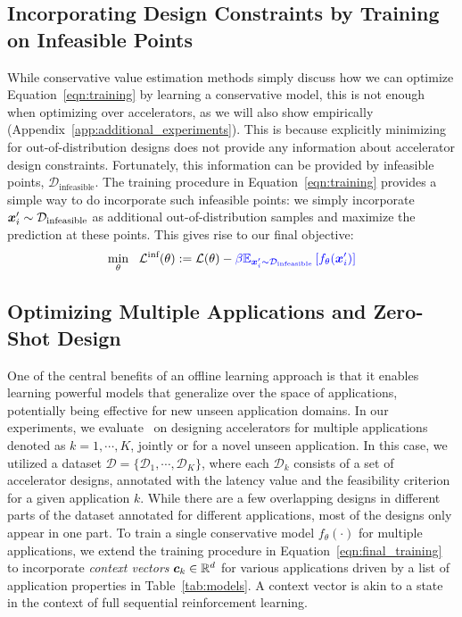 \subsection{Incorporating Design Constraints by Training on Infeasible Points}
While conservative value estimation methods simply discuss how we can optimize Equation~\ref{eqn:training} by learning a conservative model, this is not enough when optimizing over accelerators, as we will also show empirically (Appendix~\ref{app:additional_experiments}).
This is because explicitly minimizing for out-of-distribution designs does not provide any information about accelerator design constraints. Fortunately, this information can be provided by infeasible points, $\mathcal{D}_\text{infeasible}$. The training procedure in Equation~\ref{eqn:training} provides a simple way to do incorporate such infeasible points: we simply incorporate ${\boldsymbol{x}}'_i \sim \mathcal{D}_{\text{infeasible}}$ as additional out-of-distribution samples and maximize the prediction at these points.
This gives rise to our final objective:
\begin{equation}
\label{eqn:final_training}
    \min_\theta~~ \mathcal{L}^\text{inf}(\theta) := \mathcal{L}(\theta)
    - \textcolor{blue}{\beta \mathbb{E}_{{\boldsymbol{x}}'_i \sim \mathcal{D}_{\text{infeasible}}}\left[ f_\theta({\boldsymbol{x}}'_i) \right]}
\end{equation}

\subsection{Optimizing Multiple Applications and Zero-Shot Design}
%
One of the central benefits of an offline learning approach is that it enables learning powerful models that generalize over the space of applications, potentially being effective for new unseen application domains. In our experiments, we evaluate \primemethodname\ on designing accelerators for multiple applications denoted as $k=1, \cdots, K$, jointly or for a novel unseen application. In this case, we utilized a dataset $\mathcal{D} = \{\mathcal{D}_1, \cdots, \mathcal{D}_K\}$, where each $\mathcal{D}_k$ consists of a set of accelerator designs, annotated with the latency value and the feasibility criterion for a given application $k$. While there are a few overlapping designs in different parts of the dataset annotated for different applications, most of the designs only appear in one part. To train a single conservative model $f_\theta(\cdot)$ for multiple applications, we extend the training procedure in Equation~\ref{eqn:final_training} to incorporate \textit{context vectors} ${\boldsymbol{c}}_k \in \mathbb{R}^d$ for various applications driven by a list of application properties in Table~\ref{tab:models}. A context vector is akin to a state in the context of full sequential reinforcement learning. 

